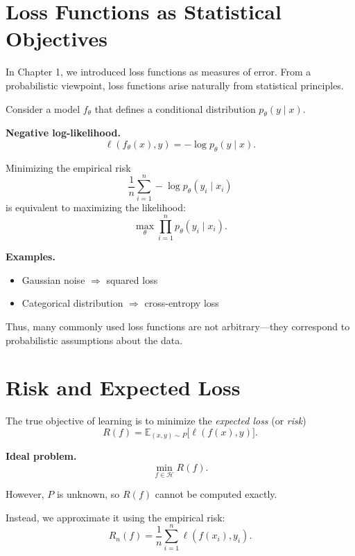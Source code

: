 \section{Loss Functions as Statistical Objectives}

In Chapter 1, we introduced loss functions as measures of error. From a probabilistic viewpoint, loss functions arise naturally from statistical principles.

\medskip

\noindent
Consider a model $f_\theta$ that defines a conditional distribution $p_\theta(y \mid x)$.

\medskip

\noindent
\textbf{Negative log-likelihood.}
\[
\ell(f_\theta(x), y) = -\log p_\theta(y \mid x).
\]

\medskip

Minimizing the empirical risk
\[
\frac{1}{n} \sum_{i=1}^n -\log p_\theta(y_i \mid x_i)
\]
is equivalent to maximizing the likelihood:
\[
\max_\theta \prod_{i=1}^n p_\theta(y_i \mid x_i).
\]

\medskip

\noindent
\textbf{Examples.}
\begin{itemize}
    \item Gaussian noise $\Rightarrow$ squared loss
    \item Categorical distribution $\Rightarrow$ cross-entropy loss
\end{itemize}

\medskip

Thus, many commonly used loss functions are not arbitrary—they correspond to probabilistic assumptions about the data.

\section{Risk and Expected Loss}

The true objective of learning is to minimize the \emph{expected loss} (or \emph{risk})
\[
R(f) = \mathbb{E}_{(x,y) \sim P} \big[ \ell(f(x), y) \big].
\]

\medskip

\noindent
\textbf{Ideal problem.}
\[
\min_{f \in \mathcal{H}} R(f).
\]

\medskip

However, $P$ is unknown, so $R(f)$ cannot be computed exactly.

\medskip

\noindent
Instead, we approximate it using the empirical risk:
\[
\hat{R}_n(f) = \frac{1}{n} \sum_{i=1}^n \ell(f(x_i), y_i).
\]

